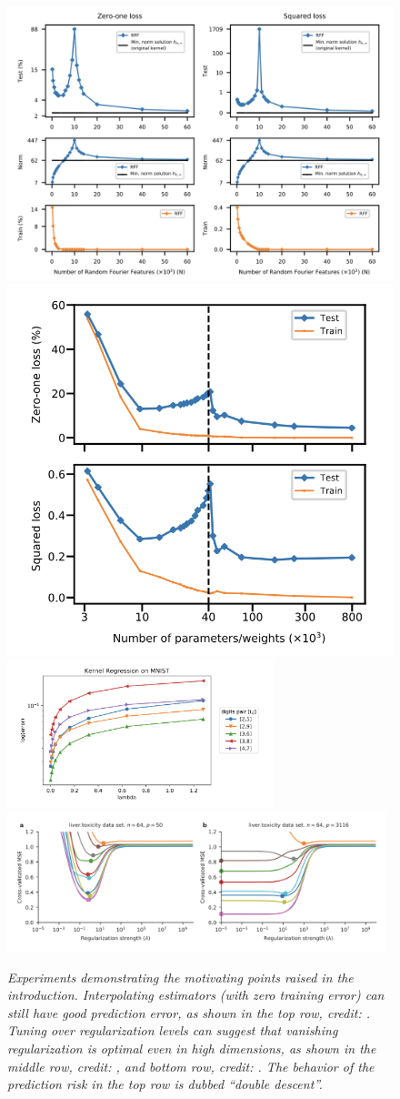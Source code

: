 \documentclass{article}
\begin{document}
\begin{figure}[p]
\centering
\hspace{-20pt}
\includegraphics[height=0.39\textwidth]{belkin1.png}
\includegraphics[height=0.39\textwidth]{belkin2.png} 
\bigskip\bigskip \\
\includegraphics[width=0.69\textwidth]{liang.png} 
\bigskip \\
\includegraphics[width=0.98\textwidth]{kobak.png}
\caption{\it Experiments demonstrating the motivating points raised in the
  introduction. Interpolating estimators (with zero training error) can still   
  have good prediction error, as shown in the top row, credit:
  \citet{belkin2019reconciling}. Tuning over regularization levels can 
  suggest that vanishing regularization is optimal even in high 
  dimensions, as shown in the middle row, credit: \citet{liang2020just}, and
  bottom row, credit: \citet{kobak2020optimal}. The behavior of the prediction
  risk in the top row is dubbed ``double descent''.}   
\label{fig:experiments}
\end{figure}
\end{document}
